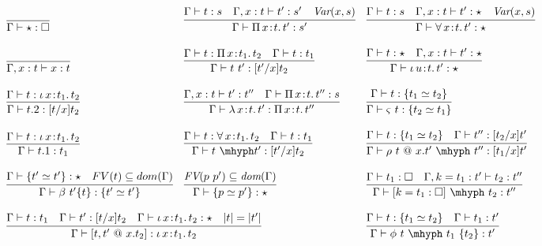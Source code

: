 \documentclass{article}
\newcommand{\abs}[4]{{#1}\, #2\! : \! #3.\, #4}
\begin{document}
\begin{figure}
  \[
  \begin{array}{lll}
    \infer{\Gamma\vdash \star : \Box}{\ } &
    \infer{\Gamma\vdash\abs{\Pi}{x}{t}{t'} : s'}{\Gamma \vdash t : s \quad \Gamma,x:t\vdash t' : s' \quad \textit{Var}(x,s)} &
    \infer{\Gamma\vdash\abs{\forall}{x}{t}{t'} : \star}{\Gamma \vdash t : s \quad \Gamma,x:t\vdash t' : \star \quad \textit{Var}(x,s)} 
    \\ \\
    \infer{\Gamma, x : t \vdash x : t}{\ } &
    \infer{\Gamma\vdash t\ t' : [t'/x]t_2}{\Gamma\vdash t : \abs{\Pi}{x}{t_1}{t_2} & \Gamma\vdash t : t_1} &
    \infer{\Gamma\vdash\abs{\iota}{u}{t}{t'} : \star}{\Gamma \vdash t : \star \quad \Gamma,x:t\vdash t' : \star} 
    \\ \\
    \infer{\Gamma\vdash t.2 : [t/x]t_2}{\Gamma\vdash t : \abs{\iota}{x}{t_1}{t_2}} &    
    \infer{\Gamma\vdash\abs{\lambda}{x}{t}{t'} : \abs{\Pi}{x}{t}{t''}}{\Gamma,x:t\vdash t':t'' \quad \Gamma \vdash \abs{\Pi}{x}{t}{t''} : s}  &
    \infer{\Gamma\vdash \varsigma\ t : \{ t_2 \simeq t_1\}}{\Gamma\vdash t : \{t_1 \simeq t_2\}}

\\ \\
    \infer{\Gamma\vdash t.1 : t_1}{\Gamma\vdash t : \abs{\iota}{x}{t_1}{t_2}} &
    \infer{\Gamma\vdash t\ \mhyph t' : [t'/x]t_2}{\Gamma\vdash t : \abs{\forall}{x}{t_1}{t_2} & \Gamma\vdash t : t_1} &
    \infer{\Gamma\vdash \rho\ t\ @\ x.t'\ \mhyph\ t'' : [t_1/x]t'}{\Gamma \vdash t : \{ t_1 \simeq t_2 \} \quad \Gamma\vdash t'' : [t_2/x]t'}
    \\ \\
    \infer{\Gamma\vdash \beta\ t'\{t\} : \{ t' \simeq t'\}}{\Gamma\vdash \{ t' \simeq t' \} : \star \quad FV(t) \subseteq dom(\Gamma)} &
    \infer{\Gamma\vdash \{ p \simeq p'\} : \star}{\textit{FV}(p\ p')\subseteq \textit{dom}(\Gamma)} &
     \infer{\Gamma\vdash [ k = t_1 : \Box ]\ \mhyph\ t_2 : t''}{\Gamma\vdash t_1 : \Box \quad
                                                               \Gamma, k = t_1 : t' \vdash t_2 : t''}  
    \\ \\
    \multicolumn{2}{l}{
    \infer{\Gamma\vdash [t,t'\ @\ x.t_2] : \abs{\iota}{x}{t_1}{t_2}}{\Gamma\vdash t : t_1 \quad \Gamma\vdash t' : [t/x]t_2 \quad \Gamma \vdash \abs{\iota}{x}{t_1}{t_2} : \star \quad |t| = |t'|}} &  
  \infer{\Gamma\vdash \phi\ t\ \mhyph\ t_1\ \{t_2\} : t'}{\Gamma \vdash t : \{t_1 \simeq t_2\} \quad \Gamma\vdash t_1 : t'}  
    \\ \\


\end{array}\]
\end{figure}
\end{document}

